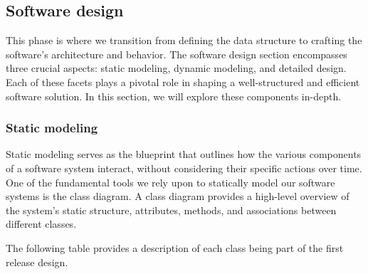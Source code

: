 \subsection{Software design}
This phase is where we transition from defining the data structure to crafting the software's architecture
and behavior. The software design section encompasses three crucial aspects: static modeling, dynamic modeling,
and detailed design. Each of these facets plays a pivotal role in shaping a well-structured and efficient
software solution. In this section, we will explore these components in-depth.

\subsubsection{Static modeling}
Static modeling serves as the blueprint that outlines how the various components of a software system
interact, without considering their specific actions over time. One of the fundamental tools we rely upon
to statically model our software systems is the class diagram. A class diagram provides a high-level overview
of the system's static structure, attributes, methods, and associations between different classes.

\noindent The following table provides a description of each class being part of the first release design.

